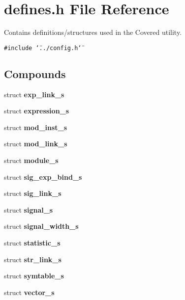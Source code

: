\section{defines.h File Reference}
\label{defines_8h}
Contains definitions/structures used in the Covered utility. 


{\tt \#include \char`\"{}../config.h\char`\"{}}\par
\subsection*{Compounds}
\begin{CompactItemize}
\item 
struct {\bf exp\_\-link\_\-s}
\item 
struct {\bf expression\_\-s}
\item 
struct {\bf mod\_\-inst\_\-s}
\item 
struct {\bf mod\_\-link\_\-s}
\item 
struct {\bf module\_\-s}
\item 
struct {\bf sig\_\-exp\_\-bind\_\-s}
\item 
struct {\bf sig\_\-link\_\-s}
\item 
struct {\bf signal\_\-s}
\item 
struct {\bf signal\_\-width\_\-s}
\item 
struct {\bf statistic\_\-s}
\item 
struct {\bf str\_\-link\_\-s}
\item 
struct {\bf symtable\_\-s}
\item 
struct {\bf vector\_\-s}
\end{CompactItemize}
